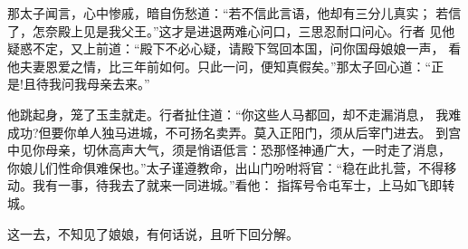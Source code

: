 那太子闻言，心中惨戚，暗自伤愁道：“若不信此言语，他却有三分儿真实；
若信了，怎奈殿上见是我父王。”这才是进退两难心问口，三思忍耐口问心。行者
见他疑惑不定，又上前道：“殿下不必心疑，请殿下驾回本国，问你国母娘娘一声，
看他夫妻恩爱之情，比三年前如何。只此一问，便知真假矣。”那太子回心道：“正
是!且待我问我母亲去来。”

他跳起身，笼了玉圭就走。行者扯住道：“你这些人马都回，却不走漏消息，
我难成功?但要你单人独马进城，不可扬名卖弄。莫入正阳门，须从后宰门进去。
到宫中见你母亲，切休高声大气，须是悄语低言：恐那怪神通广大，一时走了消息，
你娘儿们性命俱难保也。”太子谨遵教命，出山门吩咐将官：“稳在此扎营，不得移
动。我有一事，待我去了就来一同进城。”看他：
指挥号令屯军士，上马如飞即转城。

这一去，不知见了娘娘，有何话说，且听下回分解。
